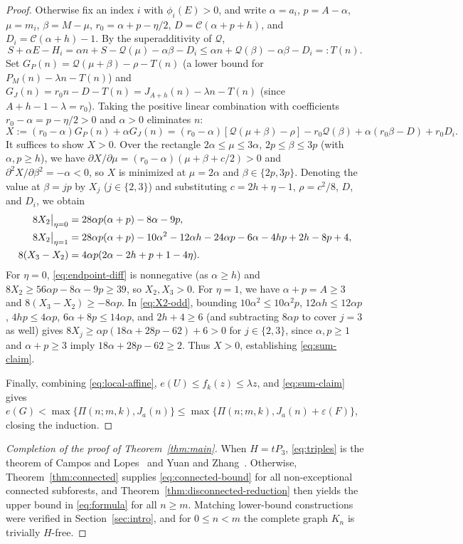 \documentclass[10pt]{article}
\theoremstyle{compactplain}
\theoremstyle{remark}\newtheorem{remark}[theorem]{Remark}
\begin{document}
\begin{proof}
Otherwise fix an index $i$ with $\phi_i(E)>0$, and write $\alpha=a_i$,
$p=A-\alpha$, $\mu=m_i$, $\beta=M-\mu$, $r_0=\alpha+p-\eta/2$,
$D=\mathcal{C}(\alpha+p+h)$, and $D_i=\mathcal{C}(\alpha+h)-1$. By the
superadditivity of $\mathcal{Q}$,
\[
 S+\alpha E-H_i=\alpha n+S-\mathcal{Q}(\mu)-\alpha\beta-D_i
 \le\alpha n+\mathcal{Q}(\beta)-\alpha\beta-D_i=:T(n).
\]
Set $G_P(n)=\mathcal{Q}(\mu+\beta)-\rho-T(n)$ (a lower bound for
$P_M(n)-\lambda n-T(n)$) and $G_J(n)=r_0n-D-T(n)=J_{A+h}(n)-\lambda n-T(n)$
(since $A+h-1-\lambda=r_0$). Taking the positive linear combination
with coefficients $r_0-\alpha=p-\eta/2>0$ and $\alpha>0$ eliminates $n$:
\[
 X:=(r_0-\alpha)G_P(n)+\alpha G_J(n)
 =(r_0-\alpha)[\mathcal{Q}(\mu+\beta)-\rho]-r_0\mathcal{Q}(\beta)
 +\alpha(r_0\beta-D)+r_0D_i.
\]
It suffices to show $X>0$. Over the rectangle $2\alpha\le\mu\le3\alpha$,
$2p\le\beta\le3p$ (with $\alpha,p\ge h$), we have
$\partial X/\partial\mu=(r_0-\alpha)(\mu+\beta+c/2)>0$ and
$\partial^2 X/\partial\beta^2=-\alpha<0$, so $X$ is minimized at
$\mu=2\alpha$ and $\beta\in\{2p,3p\}$. Denoting the value at $\beta=jp$
by $X_j$ ($j\in\{2,3\}$) and substituting $c=2h+\eta-1$, $\rho=c^2/8$,
$D$, and $D_i$, we obtain
\begin{align}
 8X_2\big|_{\eta=0} &= 28\alpha p(\alpha+p)-8\alpha-9p, \notag\\
 8X_2\big|_{\eta=1} &= 28\alpha p(\alpha+p)-10\alpha^2-12\alpha h
  -24\alpha p-6\alpha-4hp+2h-8p+4, \label{eq:X2-odd}\\
 8(X_3-X_2) &= 4\alpha p(2\alpha-2h+p+1-4\eta). \label{eq:endpoint-diff}
\end{align}
For $\eta=0$, \eqref{eq:endpoint-diff} is nonnegative (as $\alpha\ge h$)
and $8X_2\ge56\alpha p-8\alpha-9p\ge39$, so $X_2,X_3>0$. For $\eta=1$,
we have $\alpha+p=A\ge3$ and $8(X_3-X_2)\ge-8\alpha p$. In
\eqref{eq:X2-odd}, bounding $10\alpha^2\le10\alpha^2p$,
$12\alpha h\le12\alpha p$, $4hp\le4\alpha p$, $6\alpha+8p\le14\alpha p$,
and $2h+4\ge6$ (and subtracting $8\alpha p$ to cover $j=3$ as well)
gives $8X_j\ge\alpha p(18\alpha+28p-62)+6>0$ for $j\in\{2,3\}$, since
$\alpha,p\ge1$ and $\alpha+p\ge3$ imply $18\alpha+28p-62\ge2$. Thus
$X>0$, establishing \eqref{eq:sum-claim}.

Finally, combining \eqref{eq:local-affine}, $e(U)\le f_k(z)\le\lambda z$,
and \eqref{eq:sum-claim} gives
$e(G)<\max\{\Pi(n;m,k),J_a(n)\}\le\max\{\Pi(n;m,k),J_a(n)+\varepsilon(F)\}$,
closing the induction.
\end{proof}

\begin{proof}[Completion of the proof of Theorem~\ref{thm:main}]
When $H=tP_3$, \eqref{eq:triples} is the theorem of Campos and
Lopes~\cite{CL} and Yuan and Zhang~\cite{YZtriples}. Otherwise,
Theorem~\ref{thm:connected} supplies \eqref{eq:connected-bound} for all
non-exceptional connected subforests, and
Theorem~\ref{thm:disconnected-reduction} then yields the upper bound in
\eqref{eq:formula} for all $n\ge m$. Matching lower-bound constructions
were verified in Section~\ref{sec:intro}, and for $0\le n<m$ the
complete graph $K_n$ is trivially $H$-free.
\end{proof}
\end{document}

